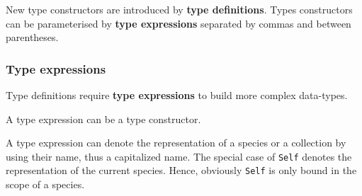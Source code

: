 New type constructors are introduced by
{\bf type definitions}.
Types constructors can be parameterised by  {\bf type expressions}
separated by commas and between parentheses.

\subsubsection{Type expressions}
Type definitions require {\bf type expressions} to build more complex
data-types.
\vspace{0.2cm}
\begin{syn}
 \is
\alt {}
\alt {}
\alt {}\hspace{-0.15cm}
\alt {} \tok{(}  \tok{)}
\alt {} \tok{->} 
\alt \tok{(}  \tok{)}
\alt \tok{(}  \tok{)}
\end{syn}
\vspace{0.2cm}

A type expression can be a type constructor.

A type expression can denote the representation of a species or a
collection by using their name, thus a capitalized name. The special
case of {\tt Self} denotes the representation of the current
species. Hence, obviously {\tt Self} is only bound in the scope of a
species.

